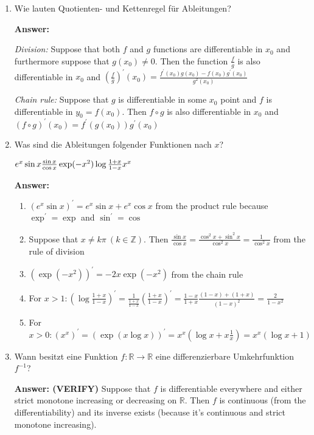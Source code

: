 \documentclass[11pt]{article}
\newcommand{\RR}[0]{\mathbb{R}}
\newcommand{\ZZ}[0]{\mathbb{Z}}
\begin{document}
\begin{enumerate}
    \item Wie lauten Quotienten- und Kettenregel für Ableitungen?
    
    \textbf{Answer:}

    \textit{Division:} Suppose that both $f$ and $g$ functions are differentiable in $x_0$ and furthermore suppose that $g(x_0) \neq 0$. Then the function $\frac{f}{g}$ is also differentiable in $x_0$ and $\left(\frac{f}{g}\right)^\prime(x_0) = \frac{f^\prime(x_0)g(x_0)-f(x_0)g^\prime(x_0)}{g^2(x_0)}$
    
    \textit{Chain rule:} Suppose that $g$ is differentiable in some $x_0$ point and $f$ is differentiable in $y_0 = f(x_0)$. Then $f \circ g$ is also differentiable in $x_0$ and $(f \circ g)^\prime(x_0) = f^\prime(g(x_0))g^\prime(x_0)$

    \item Was sind die Ableitungen folgender Funktionen nach $x$?
    
    \hspace*{\fill}
    $e^x \sin{x} \hfill \frac{\sin{x}}{\cos{x}}\hfill \exp(-x^2)\hfill \log{\frac{1+x}{1-x}}\hfill x^x$
    \hspace*{\fill}

    \textbf{Answer:}
    \begin{enumerate}
        \item $(e^x \sin{x})^\prime = e^x \sin{x} + e^x \cos{x}$ from the product rule because $\exp^\prime = \exp$ and $\sin^\prime = \cos$
        \item Suppose that $x \neq k\pi~(k \in \ZZ)$. Then $\frac{\sin{x}}{\cos{x}} = \frac{\cos^2{x} + \sin^2{x}}{\cos^2{x}} = \frac{1}{\cos^2{x}}$ from the rule of division
        \item $(\exp(-x^2))^\prime = -2x\exp(-x^2)$ from the chain rule
        \item For $x > 1\colon (\log\frac{1+x}{1-x})^\prime = \frac{1}{\frac{1+x}{1-x}} (\frac{1+x}{1-x})^\prime = \frac{1-x}{1+x} \frac{(1-x) + (1+x)}{(1-x)^2}=\frac{2}{1-x^2}$
        \item For $x > 0\colon (x^x)^\prime = (\exp(x \log{x}))^\prime = x^x (\log{x} + x\frac{1}{x}) = x^x (\log{x} + 1)$
    \end{enumerate}

    \item Wann besitzt eine Funktion $f\colon \RR\to\RR$ eine differenzierbare Umkehrfunktion $f^{-1}$?
    
    \textbf{Answer: (VERIFY)} Suppose that $f$ is differentiable everywhere and either strict monotone increasing or decreasing on $\RR$. Then $f$ is continuous (from the differentiability) and its inverse exists (because it's continuous and strict monotone increasing).


\end{enumerate}
\end{document}
